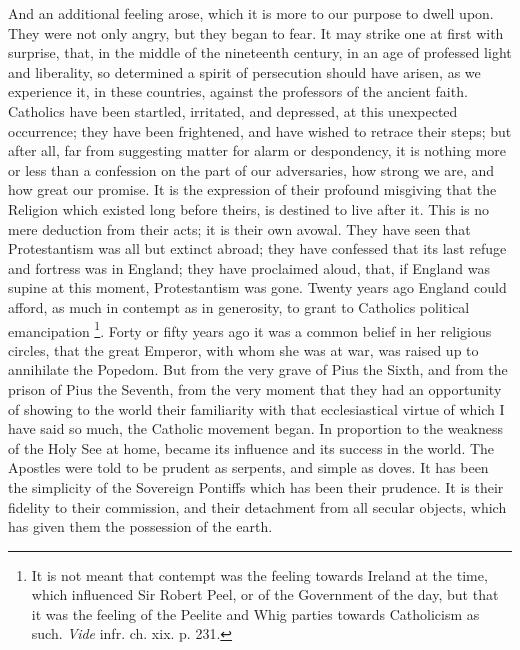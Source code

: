 And an additional feeling arose, which it is more to our purpose to
dwell upon. They were not only angry, but they began to fear. It may
strike one at first with surprise, that, in the middle of the
nineteenth century, in an age of professed light and liberality, so
determined a spirit of persecution should have arisen, as we
experience it, in these countries, against the professors of the
ancient faith. Catholics have been startled, irritated, and depressed,
at this unexpected occurrence; they have been frightened, and have
wished to retrace their steps; but after all, far from suggesting
matter for alarm or despondency, it is nothing more or less than a
confession on the part of our adversaries, how strong we are, and how
great our promise. It is the expression of their profound misgiving
that the Religion which existed long before theirs, is destined to
live after it. This is no mere deduction from their acts; it is their
own avowal. They have seen that Protestantism was all but extinct
abroad; they have confessed that its last refuge and fortress was in
England; they have proclaimed aloud, that, if England was supine at
this moment, Protestantism was gone. Twenty years ago England could
afford, as much in contempt as in generosity, to grant to Catholics
political emancipation \footnote{It is not meant that contempt was the feeling towards Ireland at
the time, which influenced Sir Robert Peel, or of the Government of
the day, but that it was the feeling of the Peelite and Whig parties
towards Catholicism as such. \emph{Vide} infr. ch. xix. p. 231.}.
Forty or fifty years ago it was a common belief in her religious
circles, that the great Emperor, with whom she was at war, was raised
up to annihilate the Popedom. But from the very grave of Pius the
Sixth, and from the prison of Pius the Seventh, from the very moment
that they had an opportunity of showing to the world their familiarity
with that ecclesiastical virtue of which I have said so much, the
Catholic movement began. In proportion to the weakness of the Holy See
at home, became its influence and its success in the world. The
Apostles were told to be prudent as serpents, and simple as doves. It
has been the simplicity of the Sovereign Pontiffs which has been their
prudence. It is their fidelity to their commission, and their
detachment from all secular objects, which has given them the
possession of the earth.


